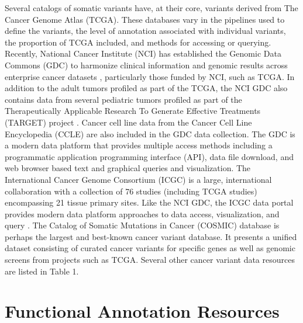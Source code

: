 \documentclass[10pt,letterpaper]{article}
\begin{document}
Several catalogs of somatic variants have, at their core, variants
derived from The Cancer Genome Atlas (TCGA). These databases vary in
the pipelines used to define the variants, the level of annotation
associated with individual variants, the proportion of TCGA included,
and methods for accessing or querying. Recently, National Cancer
Institute (NCI) has established the Genomic Data Commons (GDC) to
harmonize clinical information and genomic results across enterprise
cancer datasets \cite{Grossman2016-sk}, particularly those funded by
NCI, such as TCGA. In addition to the adult tumors profiled as part of
the TCGA, the NCI GDC also contains data from several pediatric tumors
profiled as part of the Therapeutically Applicable Research To
Generate Effective Treatments (TARGET) project
\cite{noauthor_undated-ax}. Cancer cell line data from the Cancer Cell
Line Encyclopedia (CCLE) are also included \cite{Barretina2012-yz} in
the GDC data collection. The GDC is a modern data platform that
provides multiple access methods including a programmatic application
programming interface (API), data file download, and web browser based
text and graphical queries and visualization. The International Cancer
Genome Consortium (ICGC) is a large, international collaboration with
a collection of 76 studies (including TCGA studies) encompassing 21
tissue primary sites. Like the NCI GDC, the ICGC data portal provides
modern data platform approaches to data access, visualization, and
query \cite{Zhang2011-bl}. The Catalog of Somatic Mutations in Cancer
(COSMIC) database is perhaps the largest and best-known cancer variant
database. It presents a unified dataset consisting of curated cancer
variants for specific genes as well as genomic screens from projects
such as TCGA. Several other cancer variant data resources are listed
in Table 1.

\section{Functional Annotation Resources}
\end{document}

